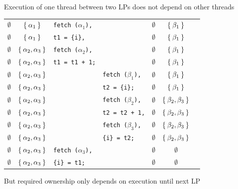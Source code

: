 \documentclass{beamer}
\begin{document}
\begin{frame} 
Execution of one thread between two LPs does not depend on other threads
\begin{center}
	\begin{tabular}{ccl||lccc}
		$\emptyset$ & $\Set{\alpha_1}$ & \texttt{fetch ($\alpha_1$),} & & $\emptyset$ &  $\Set{\beta_1}$%
		\\ $\emptyset$ & $\Set{\alpha_1}$ & \texttt{t1 = \{i\}{\color{red},}} & & $\emptyset$ &  $\Set{\beta_1}$%
		\\ $\emptyset$ & $\Set{\alpha_2, \alpha_3}$ & \color{red}\texttt{fetch  ($\alpha_2$),} & & $\emptyset$ &  $\Set{\beta_1}$%
		\\ $\emptyset$ & $\Set{\alpha_2, \alpha_3}$ & \color{red}\texttt{t1 = t1 + 1;} & & $\emptyset$ &  $\Set{\beta_1}$%
		\\[4pt] $\emptyset$ &  $\Set{\alpha_2, \alpha_3}$ & & \texttt{fetch ($\beta_1$),} & $\emptyset$ &  $\Set{\beta_1}$%
		\\ $\emptyset$ &  $\Set{\alpha_2, \alpha_3}$ & & \texttt{t2 = \{i\};} & $\emptyset$ &  $\Set{\beta_1}$ &
		\\[4pt] $\emptyset$ &  $\Set{\alpha_2, \alpha_3}$ & & \texttt{fetch ($\beta_2$),} & $\emptyset$ &  $\Set{\beta_2,\beta_3}$%
		\\ $\emptyset$ &  $\Set{\alpha_2, \alpha_3}$ & & \texttt{t2 = t2 + 1,} & $\emptyset$ &  $\Set{\beta_2,\beta_3}$%
		\\ $\emptyset$ &  $\Set{\alpha_2, \alpha_3}$ & & \texttt{fetch ($\beta_3$),} & $\emptyset$ &  $\Set{\beta_2,\beta_3}$%
		\\ $\emptyset$ &  $\Set{\alpha_2, \alpha_3}$ & & \texttt{\{i\} = t2;} & $\emptyset$ &  $\Set{\beta_2,\beta_3}$ &
		\\[4pt] $\emptyset$ & $\Set{\alpha_2, \alpha_3}$ & \color{red}\texttt{fetch ($\alpha_3$),} & & $\emptyset$ &  $\emptyset$%
		\\ $\emptyset$ & $\Set{\alpha_2, \alpha_3}$ & \texttt{{\color{red}\{i\} = t1};} & & $\emptyset$ &  $\emptyset$&
	\end{tabular}  
\end{center}
But required ownership only depends on execution until next LP
\end{frame} 
\end{document}
